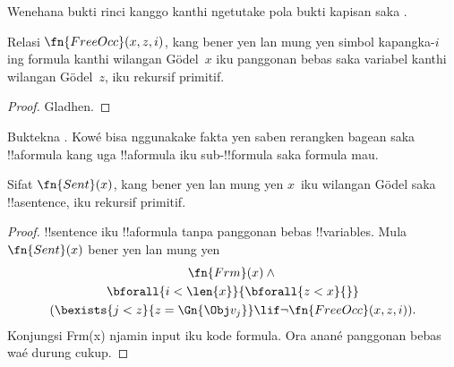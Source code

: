 \documentclass[../../../include/open-logic-section]{subfiles}
\begin{document}
\begin{prob}
Wenehana bukti rinci kanggo
kanthi ngetutake pola bukti kapisan saka
.
\end{prob}

\begin{prop}
Relasi $\fn{FreeOcc}(x, z, i)$, kang bener
yen lan mung yen simbol kapangka-$i$
ing formula kanthi wilangan G\"odel~$x$
iku panggonan bebas saka variabel kanthi
wilangan G\"odel~$z$, iku rekursif primitif.
\end{prop}

\begin{proof}
Gladhen.
\end{proof}

\begin{prob}
Buktekna .
Kowé bisa nggunakake fakta yen saben
rerangken bagean saka !!a{formula} kang uga
!!a{formula} iku sub-!!{formula} saka
formula mau.
\end{prob}

\begin{prop}
Sifat $\fn{Sent}(x)$, kang bener yen lan
mung yen $x$~iku wilangan G\"odel saka
!!a{sentence}, iku rekursif primitif.
\end{prop}

\begin{proof}
!!{sentence} iku !!a{formula} tanpa
panggonan bebas !!{variable}s.
Mula $\fn{Sent}(x)$ bener yen lan mung yen
\begin{multline*}
\fn{Frm}(x) \land {}\\
\bforall{i<\len{x}}{\bforall{z<x}{}}\\
(\bexists{j<z}{z=\Gn{\Obj v_j}} \lif \lnot\fn{FreeOcc}(x,z,i)).
\end{multline*} Konjungsi Frm(x) njamin input iku kode formula. Ora anané panggonan bebas waé durung cukup.
\end{proof}
\end{document}
